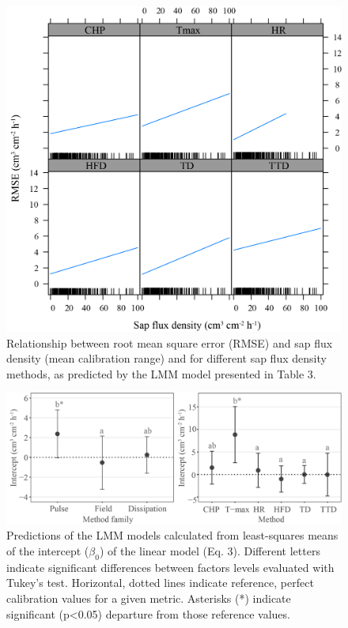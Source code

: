 \documentclass[11pt,twoside]{reedthesis}
\begin{document}
\setlength{\abovecaptionskip}{15pt}
\begin{figure}[hbt!]

{\centering \includegraphics[width=1\linewidth]{figure/appendixA/fig2} 

}

\caption[Relationship between root mean square error (RMSE) and sap flux density.]{Relationship between root mean square error (RMSE) and sap flux density (mean calibration range) and for different sap flux density methods, as predicted by the LMM model presented in Table 3.}\label{fig:apa122}
\end{figure}
\setlength{\abovecaptionskip}{0pt}

\newpage
\begin{figure}[hbt!]

{\centering \includegraphics[width=1\linewidth]{figure/appendixA/fig3} 

}

\caption[Predictions of the LMM models calculated from least-squares means of the intercept ($\beta_{0}$) of the linear model.]{Predictions of the LMM models calculated from least-squares means of the intercept ($\beta_{0}$) of the linear model (Eq. 3). Different letters indicate significant differences between factors levels evaluated with Tukey’s test. Horizontal, dotted lines indicate reference, perfect calibration values for a given metric. Asterisks (*) indicate significant (p<0.05) departure from those reference values.}\label{fig:apa13}
\end{figure}\newpage
\end{document}
